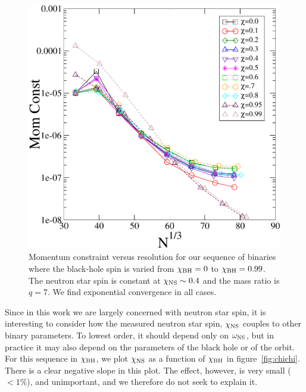 \begin{figure}
\includegraphics[width=0.95\columnwidth]{chap4/chiSeqMom}
\caption[Momentum constraints for the sequence in $\chi_{\rm BH}$.]{\label{fig:chiSeqMom} Momentum constraint versus resolution for our sequence of binaries where the black-hole spin is varied from $\chi_{\rm BH}=0$ to $\chi_{\rm BH}=0.99$. The neutron star spin is constant at $\chi_{\rm NS}\sim 0.4$ and the mass ratio is $q=7$. We find exponential convergence in all cases.}
\end{figure}

Since in this work we are largely concerned with neutron star spin, it
is interesting to consider how the measured neutron star spin,
$\chi_{\rm NS}$ couples to other binary parameters. To lowest order,
it should depend only on $\omega_{\rm NS}$, but in practice it may
also depend on the parameters of the black hole or of the orbit. For this sequence in
$\chi_{\rm BH}$, we plot $\chi_{\rm NS}$ as a function of $\chi_{\rm
  BH}$ in figure~\ref{fig:chichi}. There is a clear negative slope in
this plot. The effect, however, is very small ($<1\%$), and unimportant, and we therefore do not seek to explain it.

